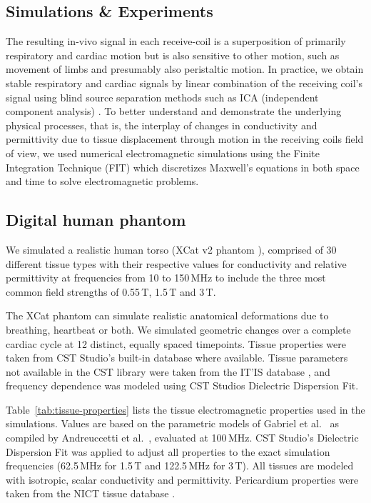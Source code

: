 \documentclass[
]{article}
\begin{document}
\subsection{Simulations \& Experiments}\label{simulations-experiments}

The resulting in-vivo signal in each receive-coil is a superposition of
primarily respiratory and cardiac motion but is also sensitive to other
motion, such as movement of limbs and presumably also peristaltic
motion. In practice, we obtain stable respiratory and cardiac signals by
linear combination of the receiving coil's signal using blind source separation
methods such as ICA (independent component analysis) \cite{Bacher2020PerformanceFramework, Bacher2020RetrospectiveCohort}. To
better understand and demonstrate the underlying physical processes,
that is, the interplay of changes in conductivity and permittivity due
to tissue displacement through motion in the receiving coils field of
view, we used numerical electromagnetic simulations using the Finite
Integration Technique (FIT) which discretizes Maxwell's equations in
both space and time to solve electromagnetic problems.

\subsection{Digital human phantom}\label{digital-human-phantom}

We simulated a realistic human torso (XCat v2 phantom \cite{Segars20104DResearch}),
comprised of 30 different tissue types with their respective values for
conductivity and relative permittivity at frequencies from 10 to 150\,MHz
to include the three most common field strengths of 0.55\,T, 1.5\,T and 3\,T.

The XCat phantom can simulate realistic anatomical deformations due to
breathing, heartbeat or both. We simulated geometric changes over a
complete cardiac cycle at 12 distinct, equally spaced timepoints. Tissue
properties were taken from CST Studio's built-in database where
available. Tissue parameters not available in the CST library were taken
from the IT'IS database \cite{HasgallITIS2018}, and frequency dependence was modeled
using CST Studios Dielectric Dispersion Fit.

Table~\ref{tab:tissue-properties} lists the tissue electromagnetic properties used in the simulations. Values are based on the parametric models of Gabriel et al.\ \cite{Gabriel1996Dielectric} as compiled by Andreuccetti et al.\ \cite{Andreuccetti1997}, evaluated at 100\,MHz. CST Studio's Dielectric Dispersion Fit was applied to adjust all properties to the exact simulation frequencies (62.5\,MHz for 1.5\,T and 122.5\,MHz for 3\,T). All tissues are modeled with isotropic, scalar conductivity and permittivity. Pericardium properties were taken from the NICT tissue database \cite{NICT2023Tissues}.
\end{document}
